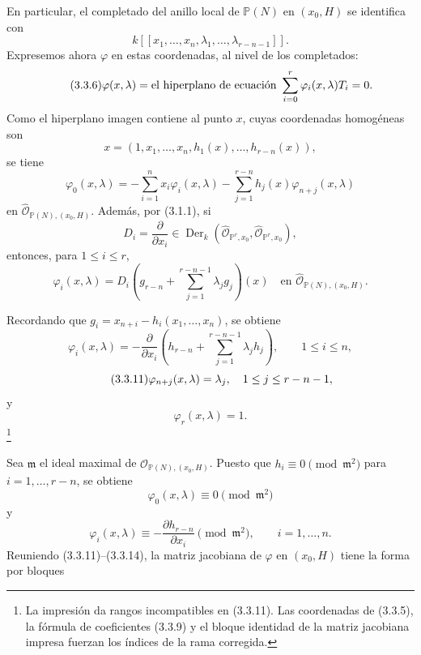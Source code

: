 En particular, el completado del anillo local de $\mathbb P(N)$ en
$(x_0,H)$ se identifica con
\[
k[[x_1,\ldots,x_n,\lambda_1,\ldots,\lambda_{r-n-1}]].
\]
Expresemos ahora $\varphi$ en estas coordenadas, al nivel de los
completados:
\begin{equation}\tag{3.3.6}
\varphi(x,\lambda)
=\text{el hiperplano de ecuación }
\sum_{i=0}^{\sisi{n+r}{r}}\varphi_i(x,\lambda)T_i=0.
\end{equation}
Como el hiperplano imagen contiene al punto $x$, cuyas coordenadas
homogéneas son
\begin{equation}\tag{3.3.7}
x=(1,x_1,\ldots,x_n,h_1(x),\ldots,h_{r-n}(x)),
\end{equation}
se tiene
\begin{equation}\tag{3.3.8}
\varphi_0(x,\lambda)
=-\sum_{i=1}^{n}x_i\varphi_i(x,\lambda)
 -\sum_{j=1}^{r-n}h_j(x)\varphi_{n+j}(x,\lambda)
\end{equation}
en $\widehat{\mathcal O}_{\mathbb P(N),(x_0,H)}$. Además, por (3.1.1),
si
\[
D_i=\frac{\partial}{\partial x_i}\in
\operatorname{Der}_k(
\widehat{\mathcal O}_{\mathbb P^r,x_0},
\widehat{\mathcal O}_{\mathbb P^r,x_0}),
\]
entonces, para $1\leq i\leq r$,
\begin{equation}\tag{3.3.9}
\varphi_i(x,\lambda)
=D_i\!\left(g_{r-n}+
\sum_{j=1}^{r-n-1}\lambda_jg_j\right)(x)
\quad\text{en }\widehat{\mathcal O}_{\mathbb P(N),(x_0,H)}.
\end{equation}

\pageoriginale

Recordando que $g_i=x_{n+i}-h_i(x_1,\ldots,x_n)$, se obtiene
\begin{equation}\tag{3.3.10}
\varphi_i(x,\lambda)
=-\frac{\partial}{\partial x_i}
\left(h_{r-n}+\sum_{j=1}^{r-n-1}\lambda_jh_j\right),
\qquad 1\leq i\leq n,
\end{equation}
\begin{equation}\tag{3.3.11}
\sisi{\varphi_i(x,\lambda)=\lambda_i,\quad1\leq i\leq n}
{\varphi_{n+j}(x,\lambda)=\lambda_j,\quad1\leq j\leq r-n-1},
\end{equation}
y
\begin{equation}\tag{3.3.12}
\varphi_r(x,\lambda)=1.
\end{equation}
\footnote{La impresión da rangos incompatibles en (3.3.11). Las
coordenadas de (3.3.5), la fórmula de coeficientes (3.3.9) y el bloque
identidad de la matriz jacobiana impresa fuerzan los índices de la
rama corregida.}

Sea $\mathfrak m$ el ideal maximal de
$\widehat{\mathcal O}_{\mathbb P(N),(x_0,H)}$. Puesto que
$h_i\equiv0\pmod{\mathfrak m^2}$ para $i=1,\ldots,r-n$, se obtiene
\begin{equation}\tag{3.3.13}
\varphi_0(x,\lambda)\equiv0\pmod{\mathfrak m^2}
\end{equation}
y
\begin{equation}\tag{3.3.14}
\varphi_i(x,\lambda)
\equiv-\frac{\partial h_{r-n}}{\partial x_i}
\pmod{\mathfrak m^2},
\qquad i=1,\ldots,n.
\end{equation}
Reuniendo (3.3.11)--(3.3.14), la matriz jacobiana de $\varphi$ en
$(x_0,H)$ tiene la forma por bloques


